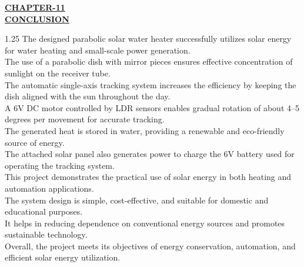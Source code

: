 \documentclass[12pt,a4paper]{article}
\begin{document}



\begin{center}
  {\fontsize{15}{18}\selectfont \bfseries \textcolor{red!80!black}{\underline{CHAPTER-11}}}\\[2mm]
  {\fontsize{16}{20}\selectfont \bfseries \textcolor{red!80!black}{\underline{CONCLUSION}}}\\[6mm]
\end{center}

\noindent
\begin{spacing}{1.25}
{\fontsize{10.2}{15}\selectfont
The designed parabolic solar water heater successfully utilizes solar energy for water heating and small-scale power generation.\\[3mm]
The use of a parabolic dish with mirror pieces ensures effective concentration of sunlight on the receiver tube.\\[3mm]
The automatic single-axis tracking system increases the efficiency by keeping the dish aligned with the sun throughout the day.\\[3mm]
A 6V DC motor controlled by LDR sensors enables gradual rotation of about 4--5 degrees per movement for accurate tracking.\\[3mm]
The generated heat is stored in water, providing a renewable and eco-friendly source of energy.\\[3mm]
The attached solar panel also generates power to charge the 6V battery used for operating the tracking system.\\[3mm]
This project demonstrates the practical use of solar energy in both heating and automation applications.\\[3mm]
The system design is simple, cost-effective, and suitable for domestic and educational purposes.\\[3mm]
It helps in reducing dependence on conventional energy sources and promotes sustainable technology.\\[3mm]
Overall, the project meets its objectives of energy conservation, automation, and efficient solar energy utilization.
}
\end{spacing}
\clearpage

\end{document}
